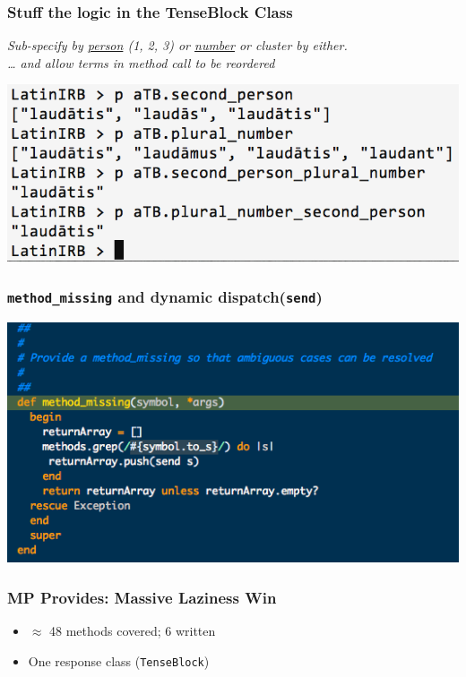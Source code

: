 \documentclass[slidestop,compress,mathserif]{beamer}
\begin{document}
\begin{frame}
	\frametitle{Stuff the logic in the TenseBlock Class}
	\emph{
		Sub-specify by \underline{person} (1, 2, 3) or \underline{number} or
    cluster by either. \\
		\pause
		{\ldots} and allow terms in method call to be reordered
  }
	\vskip 0.5cm
	\begin{center}
		\includegraphics[scale=0.38]{img/conj_subspec.png}
	\end{center}
\end{frame}

\begin{frame}
	\frametitle{\texttt{method\_missing} and dynamic dispatch(\texttt{send})}
	\includegraphics[scale=0.55]{img/tenseblock_mm.png}
\end{frame}

\begin{frame}
	\frametitle{MP Provides:  Massive Laziness Win}
	\begin{itemize}
		\item $\approx$ 48 methods covered; 6 written
		\pause
		\item One response class (\texttt{TenseBlock})
	\end{itemize}
\end{frame}
\end{document}
